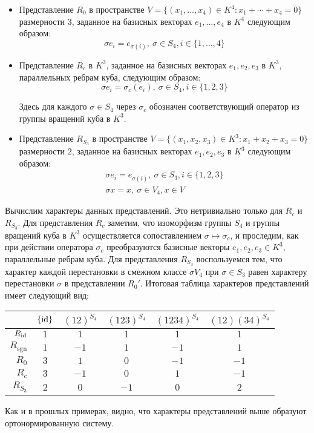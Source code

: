 \begin{example}
\begin{itemize}
		\item Представление $R_0$ в пространстве $V = \{(x_1, \dotsc, x_4) \in K^4 : x_1 + \dotsb + x_4 = 0\}$ размерности $3$, заданное на базисных векторах $e_1, \dotsc, e_4$ в $K^4$ следующим образом:
		\[\sigma e_i = e_{\sigma(i)},~\sigma \in S_4, i \in \{1, \dotsc, 4\}\]
		
		\item Представление $R_c$ в $K^3$, заданное на базисных векторах $e_1, e_2, e_3$ в $K^3$, параллельных ребрам куба, следующим образом:
		\[\sigma e_i = \sigma_c(e_{i}),~\sigma \in S_4, i \in \{1, 2, 3\}\]
		
		Здесь для каждого $\sigma \in S_4$ через $\sigma_c$ обозначен соответствующий оператор из группы вращений куба в $K^3$.
		
		\item Представление $R_{S_3}$ в пространстве $V = \{(x_1, x_2, x_3) \in K^3 : x_1 + x_2 + x_3 = 0\}$ размерности $2$, заданное на базисных векторах $e_1, e_2, e_3$ в $K^3$ следующим образом:
		\begin{gather*}
			\sigma e_i = e_{\sigma(i)},~\sigma \in S_3, i \in \{1, 2, 3\}\\
			\sigma x = x,~\sigma \in V_4, x \in V
		\end{gather*}
	\end{itemize}

	Вычислим характеры данных представлений. Это нетривиально только для $R_c$ и $R_{S_3}$.  Для представления $R_c$ заметим, что изоморфизм группы $S_4$ и группы вращений куба в $K^3$ осуществляется сопоставлением $\sigma \mapsto \sigma_c$, и проследим, как при действии оператора $\sigma_c$ преобразуются базисные векторы $e_1, e_2, e_3 \in K^3$, параллельные ребрам куба. Для представления $R_{S_3}$ воспользуемся тем, что характер каждой перестановки в смежном классе $\sigma V_4$ при $\sigma \in S_3$ равен характеру перестановки $\sigma$ в представлении $R_0'$. Итоговая таблица характеров представлений имеет следующий вид:
	\begin{center}
		\begin{tabular}{r|c|c|c|c|c}
			& $\{\mathrm{id}\}$ & $(12)^{S_4}$ &  $(123)^{S_4}$ & $(1234)^{S_4}$ & $(12)(34)^{S_4}$ \\ \hline
			$R_{\mathrm{id}}$ &    $1$    &   $1$   &  $1$  &      $1$ & $1$     \\
			$R_{\mathrm{sgn}}$ &    $1$    &   $-1$   &  $1$  &      $-1$ & $1$     \\
			$R_0$ &    $3$    &      $1$      &      $0$      &       $-1$ &  $-1$ \\
			$R_c$ &    $3$    &      $-1$      &      $0$      &       $1$ & $-1$\\ 
			$R_{S_3}$ &    $2$    &      $0$      &      $-1$      &       $0$ & $2$\\
		\end{tabular}
	\end{center}
	
	Как и в прошлых примерах, видно, что характеры представлений выше образуют ортонормированную систему.
\end{example}

